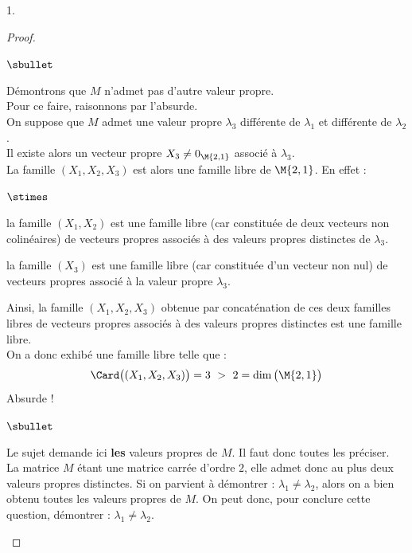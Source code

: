 \documentclass[11pt]{article}%
\begin{document}
\begin{noliste}{1.}
\begin{proof}
\begin{noliste}{$\sbullet$}
  \item Démontrons que $M$ n'admet pas d'autre valeur propre.\\
    Pour ce faire, raisonnons par l'absurde.\\
    On suppose que $M$ admet une valeur propre $\lambda_3$ différente
    de $\lambda_1$ et différente de $\lambda_2$.\\
    Il existe alors un vecteur propre $X_3 \neq 0_{\M{2,1}}$ associé à
    $\lambda_3$.\\[.2cm]
    La famille $(X_1, X_2, X_3)$ est alors une famille libre de
    $\M{2,1}$. En effet :
    \begin{noliste}{$\stimes$}
    \item la famille $(X_1, X_2)$ est une famille libre (car
      constituée de deux vecteurs non colinéaires) de vecteurs
      propres associés à des valeurs propres distinctes de $\lambda_3$.
    \item la famille $(X_3)$ est une famille libre (car constituée
      d'un vecteur non nul) de vecteurs propres associé à la valeur
      propre $\lambda_3$.
    \end{noliste}
    Ainsi, la famille $(X_1, X_2, X_3)$ obtenue par concaténation de
    ces deux familles libres de vecteurs propres associés à des
    valeurs propres distinctes est une famille libre.\\
    On a donc exhibé une famille libre telle que : 
    \[
    \Card \big( (X_1, X_2, X_3) \big) = 3 \ > \ 2 = \dim\big(\M{2,1}
    \big)
    \]
    Absurde ! %
  \end{noliste}
  \begin{remarkL}{.97}%
    \begin{noliste}{$\sbullet$}
    \item Le sujet demande ici {\bf les} valeurs propres de $M$. Il
      faut donc toutes les préciser.\\
      La matrice $M$ étant une matrice carrée d'ordre $2$, elle admet
      donc au plus deux valeurs propres distinctes. Si on parvient à
      démontrer : $\lambda_1 \neq \lambda_2$, alors on a bien obtenu
      toutes les valeurs propres de $M$. On peut donc, pour conclure
      cette question, démontrer : $\lambda_1 \neq \lambda_2$.\\

\end{noliste}
\end{remarkL}
\end{proof}
\end{noliste}
\end{document}
